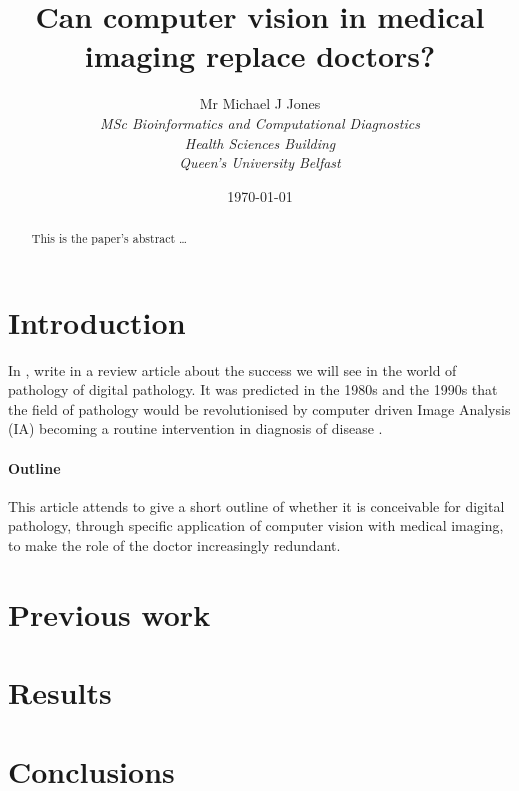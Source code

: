 \documentclass[12pt]{article}
\title{Can computer vision in medical imaging replace doctors?} %
\author{
        Mr Michael J Jones \\
                \em{MSc Bioinformatics and Computational Diagnostics}\\
       	Health Sciences Building\\
        Queen's University Belfast
}
\date{\today}
\begin{document}
\maketitle

\begin{abstract}
This is the paper's abstract \ldots
\end{abstract}

\section{Introduction}
In \citeyear{hamilton2014digital}, \citeauthor{hamilton2014digital} write in a review article about the success we 
will see in the world of pathology of digital pathology. It was predicted in the 1980s and the 1990s that the field of 
pathology would be revolutionised by computer driven Image Analysis (IA) becoming a routine intervention in diagnosis 
of disease \parencite{hamilton2014digital}.


\paragraph{Outline}
This article attends to give a short outline of whether it is conceivable for digital pathology, through specific 
application of computer vision with medical imaging, to make the role of the doctor increasingly redundant.

\section{Previous work}\label{previous work}

\section{Results}\label{results}

\section{Conclusions}\label{conclusions}

\printbibliography
\end{document}
